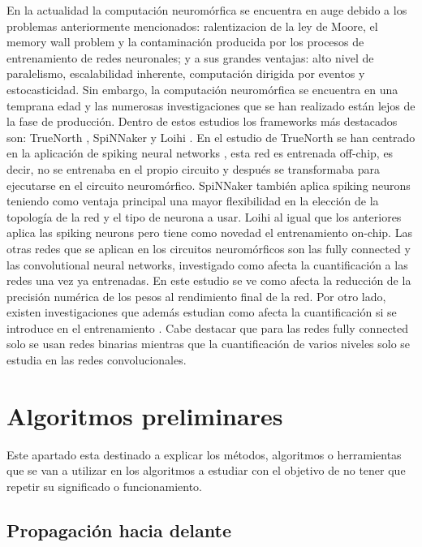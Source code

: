 En la actualidad la computación neuromórfica se encuentra en auge debido a los problemas anteriormente mencionados: ralentizacion de la ley de Moore, el memory wall problem y la contaminación producida por los procesos de entrenamiento de redes neuronales; y a sus  grandes ventajas: alto nivel de paralelismo, escalabilidad inherente, computación dirigida por eventos y estocasticidad. Sin embargo, la computación neuromórfica se encuentra en una temprana edad y las numerosas investigaciones que se han realizado están lejos de la fase de producción. Dentro de estos estudios los frameworks más destacados son: TrueNorth \cite{doi:10.1142/S0129065709002002}, SpiNNaker \cite{6750072} y Loihi \cite{8259423}. En el estudio de TrueNorth se han centrado en la aplicación de spiking neural networks \cite{doi:10.1142/S0129065709002002}, esta red es entrenada off-chip, es decir, no se entrenaba en el propio circuito y después se transformaba para ejecutarse en el circuito neuromórfico. SpiNNaker también aplica spiking neurons teniendo como ventaja principal una mayor flexibilidad en la elección de la topología de la red y el tipo de neurona a usar. Loihi al igual que los anteriores aplica las spiking neurons pero tiene como novedad el entrenamiento on-chip. Las otras redes que se aplican en los circuitos neuromórficos son las fully connected y las convolutional neural networks, investigado como afecta la cuantificación a las redes una vez ya entrenadas. En este estudio \cite{10481/72221} se ve como afecta la reducción de la precisión numérica de los pesos al rendimiento final de la red. Por otro lado, existen investigaciones que además estudian como afecta la cuantificación si se introduce en el entrenamiento \cite{8705375}. Cabe destacar que para las redes fully connected solo se usan redes binarias mientras que la cuantificación de varios niveles solo se estudia en las redes convolucionales. \cite{DBLP:journals/corr/SchumanPPBDRP17}

\section{Algoritmos preliminares}

Este apartado esta destinado a explicar los métodos, algoritmos o herramientas que se van a utilizar en los algoritmos a estudiar con el objetivo de no tener que repetir su significado o funcionamiento.

\subsection{Propagación hacia delante}

